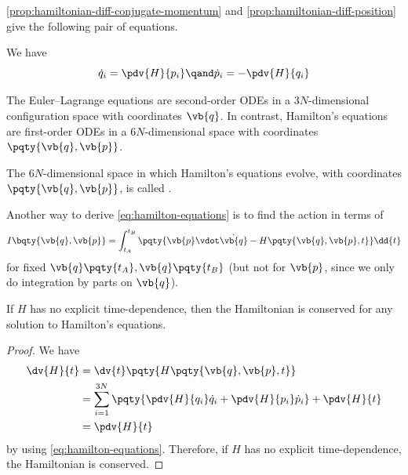\autoref{prop:hamiltonian-diff-conjugate-momentum} and \autoref{prop:hamiltonian-diff-position} give the following pair of equations.

\begin{theorem}
    We have
    \begin{equation}
        \label{eq:hamilton-equations}
        \dot{q}_i = \pdv{H}{p_i} \qand \dot{p}_i = - \pdv{H}{q_i}
    \end{equation}
\end{theorem}

The Euler--Lagrange equations are second-order ODEs in a \(3N\)-dimensional configuration space with coordinates \(\vb{q}\). In contrast, Hamilton's equations are first-order ODEs in a \(6N\)-dimensional space with coordinates \(\pqty{\vb{q}, \vb{p}}\).

\begin{definition}
    The \(6N\)-dimensional space in which Hamilton's equations evolve, with coordinates \(\pqty{\vb{q}, \vb{p}}\), is called .
\end{definition}

Another way to derive \eqref{eq:hamilton-equations} is to find the action in terms of
\[
    I\bqty{\vb{q}, \vb{p}} = \int_{t_A}^{t_B} \pqty{\vb{p} \vdot \dot{\vb{q}} - H \pqty{\vb{q}, \vb{p}, t}} \dd{t}
\]
for fixed \(\vb{q} \pqty{t_A}, \vb{q} \pqty{t_B}\) (but not for \(\vb{p}\), since we only do integration by parts on \(\vb{q}\)).

\begin{proposition}
    If \(H\) has no explicit time-dependence, then the Hamiltonian is conserved for any solution to Hamilton's equations.
\end{proposition}

\begin{proof}
    We have
    \begin{align*}
        \dv{H}{t} &= \dv{t} \pqty{H \pqty{\vb{q}, \vb{p}, t}} \\
        &= \sum_{i = 1}^{3N} \pqty{\pdv{H}{q_i} \dot{q}_i + \pdv{H}{p_i} \dot{p}_i} + \pdv{H}{t} \\
        &= \pdv{H}{t}
    \end{align*}
    by using \eqref{eq:hamilton-equations}. Therefore, if \(H\) has no explicit time-dependence, the Hamiltonian is conserved.
\end{proof}